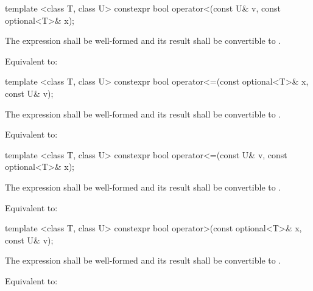 %
\begin{itemdecl}
template <class T, class U> constexpr bool operator<(const U& v, const optional<T>& x);
\end{itemdecl}

\begin{itemdescr}
\pnum
\requires
The expression  shall be well-formed and
its result shall be convertible to .

\pnum
\effects
Equivalent to: 
\end{itemdescr}

%
\begin{itemdecl}
template <class T, class U> constexpr bool operator<=(const optional<T>& x, const U& v);
\end{itemdecl}

\begin{itemdescr}
\pnum
\requires
The expression  shall be well-formed and
its result shall be convertible to .

\pnum
\effects
Equivalent to: 
\end{itemdescr}

%
\begin{itemdecl}
template <class T, class U> constexpr bool operator<=(const U& v, const optional<T>& x);
\end{itemdecl}

\begin{itemdescr}
\pnum
\requires
The expression  shall be well-formed and
its result shall be convertible to .

\pnum
\effects
Equivalent to: 
\end{itemdescr}

%
\begin{itemdecl}
template <class T, class U> constexpr bool operator>(const optional<T>& x, const U& v);
\end{itemdecl}

\begin{itemdescr}
\pnum
\requires
The expression  shall be well-formed and
its result shall be convertible to .

\pnum
\effects
Equivalent to: 
\end{itemdescr}

